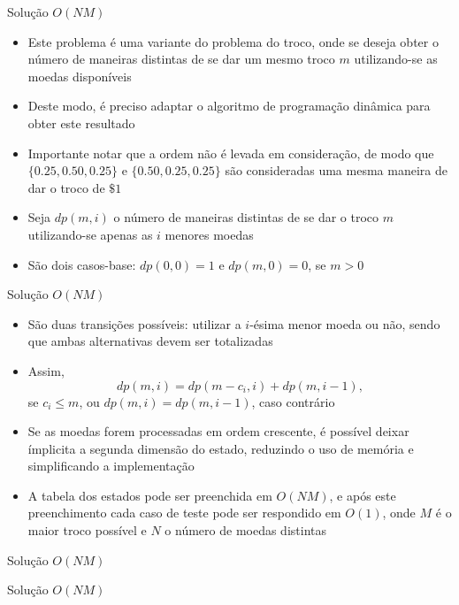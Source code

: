 \begin{frame}[fragile]{Solução $O(NM)$}

   \begin{itemize}
        \item Este problema é uma variante do problema do troco, onde se deseja obter o número
            de maneiras distintas de se dar um mesmo troco $m$ utilizando-se as moedas disponíveis

        \item Deste modo, é preciso adaptar o algoritmo de programação dinâmica para obter este
            resultado

        \item Importante notar que a ordem não é levada em consideração, de modo que 
            $\{ 0.25, 0.50, 0.25 \}$ e $\{ 0.50, 0.25, 0.25 \}$ são consideradas uma mesma
            maneira de dar o troco de $\$1$

        \item Seja $dp(m, i)$ o número de maneiras distintas de se dar o troco $m$ utilizando-se
            apenas as $i$ menores moedas

        \item São dois casos-base: $dp(0, 0) = 1$ e $dp(m, 0) = 0$, se $m > 0$
   \end{itemize}

\end{frame}

\begin{frame}[fragile]{Solução $O(NM)$}

    \begin{itemize}
        \item São duas transições possíveis: utilizar a $i$-ésima menor moeda ou não, sendo que
            ambas alternativas devem ser totalizadas

        \item Assim,
        \[
            dp(m, i) = dp(m - c_i, i) + dp(m, i - 1),
        \]
        se $c_i \leq m$, ou $dp(m, i) = dp(m, i - 1)$, caso contrário

        \item Se as moedas forem processadas em ordem crescente, é possível deixar ímplicita a
            segunda dimensão do estado, reduzindo o uso de memória e simplificando a implementação

        \item A tabela dos estados pode ser preenchida em $O(NM)$, e após este preenchimento
            cada caso de teste pode ser respondido em $O(1)$, onde $M$ é o maior troco
            possível e $N$ o número de moedas distintas
    \end{itemize}

\end{frame}

\begin{frame}[fragile]{Solução $O(NM)$}
\end{frame}

\begin{frame}[fragile]{Solução $O(NM)$}
\end{frame}
